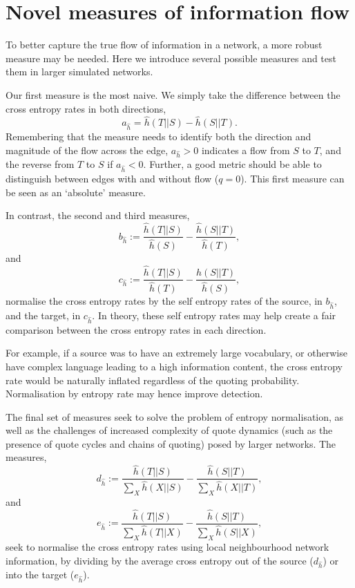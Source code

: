 \section{Novel measures of information flow}

To better capture the true flow of information in a network, a more robust measure may be needed. Here we introduce several possible measures and test them in larger simulated networks.

Our first measure is the most naive. We simply take the difference between the cross entropy rates in both directions, 
\begin{equation}a_{\hat{h}}  = \hat{h}(T||S) - \hat{h}(S||T).\end{equation}
Remembering that the measure needs to identify both the direction and magnitude of the flow across the edge, $a_{\hat{h}} >0$ indicates a flow from $S$ to $T$, and the reverse from $T$ to $S$ if $a_{\hat{h}} <0$. Further, a good metric should be able to distinguish between edges with and without flow ($q=0$). This first measure can be seen as an `absolute' measure.

In contrast, the second and third measures, 
\begin{equation}
b_{\hat{h}} := \frac{\hat{h}(T||S)}{\hat{h}(S)} - \frac{\hat{h}(S||T)}{\hat{h}(T)},
\end{equation}
and
\begin{equation}
c_{\hat{h}} := \frac{\hat{h}(T||S)}{\hat{h}(T)} - \frac{\hat{h}(S||T)}{\hat{h}(S)},
\end{equation}
normalise the cross entropy rates by the self entropy rates of the source, in $b_{\hat{h}}$, and the target, in $c_{\hat{h}}$. In theory, these self entropy rates may help create a fair comparison between the cross entropy rates in each direction.

For example, if a source was to have an extremely large vocabulary, or otherwise have complex language leading to a high information content, the cross entropy rate would be naturally inflated regardless of the quoting probability. Normalisation by entropy rate may hence improve detection.

The final set of measures seek to solve the problem of entropy normalisation, as well as the challenges of increased complexity of quote dynamics (such as the presence of quote cycles and chains of quoting) posed by larger networks. The measures, 
\begin{equation} 
	d_{\hat{h}} := \frac{\hat{h}{(T||S)}}{\sum_X \hat{h}(X||S)} - \frac{\hat{h}(S||T)}{\sum_X \hat{h}(X||T)},
\end{equation} 
and
\begin{equation} 
	e_{\hat{h}} := \frac{\hat{h}(T||S)}{\sum_X \hat{h}(T||X)} - \frac{\hat{h}(S||T)}{\sum_X \hat{h}(S||X)},
\end{equation}
seek to normalise the cross entropy rates using local neighbourhood network information, by dividing by the average cross entropy out of the source ($d_{\hat{h}}$) or into the target ($e_{\hat{h}}$). 

